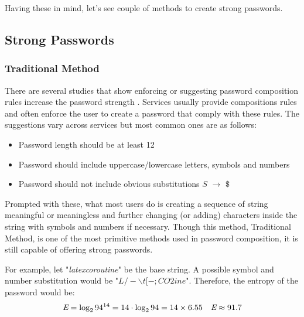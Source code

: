 \documentclass[acmsmall,nonacm]{acmart}
\begin{document}
Having these in mind, let's see couple of methods to create strong passwords.

\subsection{Strong Passwords} \label{strong}

\subsubsection{Traditional Method} \label{creation-traditional}

There are several studies that show enforcing or suggesting password composition rules increase the password strength \cite{shay_2010, shay_2015}. Services usually provide compositions rules and often enforce the user to create a password that comply with these rules. The suggestions vary across services but most common ones are as follows:

\begin{itemize}
\item Password length should be at least 12
\item Password should include uppercase/lowercase letters, symbols and numbers
\item Password should not include obvious substitutions $S$ ${\displaystyle \rightarrow }$ $\$$
\end{itemize}

Prompted with these, what most users do is creating a sequence of string meaningful or meaningless and further changing (or adding) characters inside the string with symbols and numbers if necessary. Though this method, Traditional Method, is one of the most primitive methods used in password composition, it is still capable of offering strong passwords.


For example, let "\emph{latexcoroutine}" be the base string. A possible symbol and number substitution would be "$L/-\backslash t[-;CO2ine$". Therefore, the entropy of the password would be:
\begin{align*}
    \emph{E} = \log_2 94^{14} &= 14 \cdot \log_2 94 = 14 \times 6.55 &\emph{E} \approx 91.7 
\end{align*}



\begin{comment}
Traditional met
Traditional method refers to creating password based on the given requirements and/or suggestions on the screen during the password creation phase.
Though there are studies that shows enforcing or suggesting these rules increase the password
Since there is no consensus on suggestions, users create passwords that differ in length and complexity based on what the service requires/suggests. Variance in length and password directly affects the strength of password which means that created password are  
\end{comment}
\end{document}
